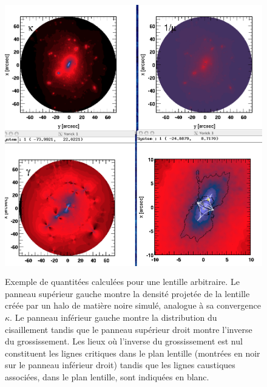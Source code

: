 \begin{figure}[htbp]
	\centering
		\includegraphics[height=12cm]{figs/SPLHALO.png}
	\caption[Les quantités pertinentes d'une lentille gravitationnelle]{Exemple de quantitées calculées pour une lentille arbitraire. Le panneau supérieur gauche montre la densité projetée de la lentille créée par un halo de matière noire simulé, analogue à sa convergence $\kappa$. Le panneau inférieur gauche montre la distribution du cisaillement tandis que le panneau supérieur droit montre l'inverse du grossissement. Les lieux où l'inverse du grossissement est nul constituent les lignes critiques dans le plan lentille (montrées en noir sur le panneau inférieur droit) tandis que les lignes caustiques associées, dans le plan lentille, sont indiquées en blanc.} 
	\label{f:SPLHALO}
\end{figure}

